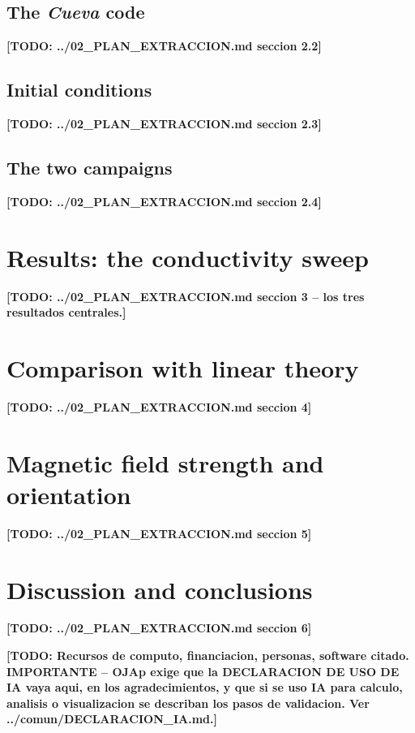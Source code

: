 \documentclass[apj]{openjournal}
\newcommand{\todo}[1]{\textbf{[TODO: #1]}}
\begin{document}
\subsection{The \textit{Cueva} code}
\todo{../02\_PLAN\_EXTRACCION.md seccion 2.2}
\subsection{Initial conditions}
\todo{../02\_PLAN\_EXTRACCION.md seccion 2.3}
\subsection{The two campaigns}
\todo{../02\_PLAN\_EXTRACCION.md seccion 2.4}

\section{Results: the conductivity sweep}
\label{sec:results}
\todo{../02\_PLAN\_EXTRACCION.md seccion 3 -- los tres resultados centrales.}

\section{Comparison with linear theory}
\label{sec:theory}
\todo{../02\_PLAN\_EXTRACCION.md seccion 4}

\section{Magnetic field strength and orientation}
\label{sec:magnetic}
\todo{../02\_PLAN\_EXTRACCION.md seccion 5}

\section{Discussion and conclusions}
\label{sec:conclusions}
\todo{../02\_PLAN\_EXTRACCION.md seccion 6}

\acknowledgments

\todo{Recursos de computo, financiacion, personas, software citado.
IMPORTANTE -- OJAp exige que la DECLARACION DE USO DE IA vaya aqui, en los
agradecimientos, y que si se uso IA para calculo, analisis o visualizacion se
describan los pasos de validacion. Ver ../comun/DECLARACION\_IA.md.}

\end{document}
